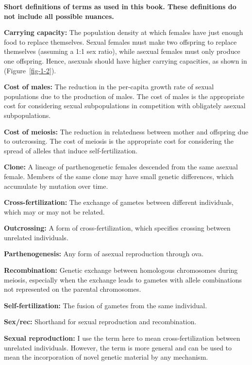\documentclass[
  letterpaper,
]{book}
\begin{document}
\begin{tcolorbox}[enhanced jigsaw, coltitle=black, titlerule=0mm, colframe=quarto-callout-tip-color-frame, breakable, opacitybacktitle=0.6, bottomtitle=1mm, rightrule=.15mm, bottomrule=.15mm, colback=white, colbacktitle=quarto-callout-tip-color!10!white, arc=.35mm, leftrule=.75mm, toptitle=1mm, left=2mm, toprule=.15mm, title=\textcolor{quarto-callout-tip-color}{\faLightbulb}\hspace{0.5em}{Box 1.1}, opacityback=0]

\textbf{Short definitions of terms as used in this book. These
definitions do not include all possible nuances.}

\textbf{Carrying capacity:} The population density at which females have
just enough food to replace themselves. Sexual females must make two
offspring to replace themselves (assuming a 1:1 sex ratio), while
asexual females must only produce one offspring. Hence, asexuals should
have higher carrying capacities, as shown in (Figure~\ref{fig-1-2}).

\textbf{Cost of males:} The reduction in the per-capita growth rate of
sexual populations due to the production of males. The cost of males is
the appropriate cost for considering sexual subpopulations in
competition with obligately asexual subpopulations.

\textbf{Cost of meiosis:} The reduction in relatedness between mother
and offspring due to outcrossing. The cost of meiosis is the appropriate
cost for considering the spread of alleles that induce
self-fertilization.

\textbf{Clone:} A lineage of parthenogenetic females descended from the
same asexual female. Members of the same clone may have small genetic
differences, which accumulate by mutation over time.

\textbf{Cross-fertilization:} The exchange of gametes between different
individuals, which may or may not be related.

\textbf{Outcrossing:} A form of cross-fertilization, which specifies
crossing between unrelated individuals.

\textbf{Parthenogenesis:} Any form of asexual reproduction through ova.

\textbf{Recombination:} Genetic exchange between homologous chromosomes
during meiosis, especially when the exchange leads to gametes with
allele combinations not represented on the parental chromosomes.

\textbf{Self-fertilization:} The fusion of gametes from the same
individual.

\textbf{Sex/rec:} Shorthand for sexual reproduction and recombination.

\textbf{Sexual reproduction:} I use the term here to mean
cross-fertilization between unrelated individuals. However, the term is
more general and can be used to mean the incorporation of novel genetic
material by any mechanism.

\end{tcolorbox}
\end{document}

